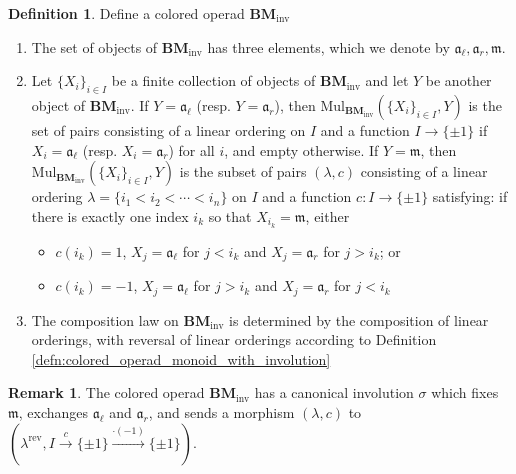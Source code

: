 \documentclass{article}
\theoremstyle{definition}
\newtheorem{definition}[theorem]{Definition}
\newtheorem{remark}[theorem]{Remark}
\begin{document}
\begin{definition}
    Define a colored operad $ \mathbf{BM}_\mathrm{inv} $
    \begin{enumerate}[label=(\roman*)]
        \item The set of objects of $ \mathbf{BM}_\mathrm{inv} $ has three elements, which we denote by $ \mathfrak{a}_\ell, \mathfrak{a}_r, \mathfrak{m} $. 
        \item Let $ \{X_i\}_{i \in I} $ be a finite collection of objects of $ \mathbf{BM}_{\mathrm{inv}} $ and let $ Y $ be another object of $ \mathbf{BM}_{\mathrm{inv}} $. 
        If $ Y = \mathfrak{a}_\ell $ (resp. $ Y = \mathfrak{a}_r $), then $ \mathrm{Mul}_{\mathbf{BM}_\mathrm{inv}} \left(\{X_i\}_{i \in I}, Y\right) $ is the set of pairs consisting of a linear ordering on $ I $ and a function $ I \to \{\pm 1\} $ if $ X_i = \mathfrak{a}_\ell $ (resp. $ X_i = \mathfrak{a}_r $) for all $ i $, and empty otherwise. 
        If $ Y = \mathfrak{m} $, then $ \mathrm{Mul}_{\mathbf{BM}_\mathrm{inv}} \left(\{X_i\}_{i \in I}, Y\right) $ is the subset of pairs $ (\lambda, c) $ consisting of a linear ordering $ \lambda = \{i_1 < i_2 < \cdots < i_n\} $ on $ I $ and a function $ c \colon I \to \{\pm 1 \} $ satisfying: if  there is exactly one index $ i_k $ so that $ X_{i_k} = \mathfrak{m} $, either
        \begin{itemize}
            \item $ c(i_k) = 1 $, $ X_{j} = \mathfrak{a}_\ell $ for $ j < i_k $ and $ X_j = \mathfrak{a}_{r} $ for $ j > i_k $; or
            \item $ c(i_k) = - 1 $, $ X_{j} = \mathfrak{a}_\ell $ for $ j > i_k $ and $ X_j = \mathfrak{a}_{r} $ for $ j < i_k $ 
        \end{itemize}
        \item The composition law on $ \mathbf{BM}_{\mathrm{inv}} $ is determined by the composition of linear orderings, with reversal of linear orderings according to Definition \ref{defn:colored_operad_monoid_with_involution} 
    \end{enumerate}
\end{definition} 
\begin{remark}\label{rmk:bimod_opd_involution}
    The colored operad $ \mathbf{BM}_{\mathrm{inv}} $ has a canonical involution $ \sigma $ which fixes $ \mathfrak{m} $, exchanges $ \mathfrak{a}_\ell $ and $ \mathfrak{a}_r $, and sends a morphism $ (\lambda, c) $ to $ (\lambda^{\mathrm{rev}}, I \xrightarrow{c} \{\pm 1\} \xrightarrow{\cdot (-1)} \{\pm 1 \}) $. 
\end{remark}
\end{document}
